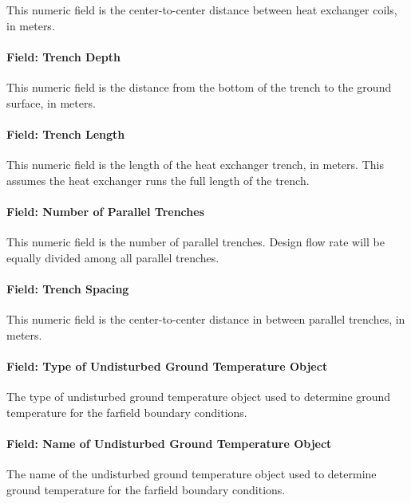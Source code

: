This numeric field is the center-to-center distance between heat exchanger coils, in meters.

\paragraph{Field: Trench Depth}\label{field-trench-depth}

This numeric field is the distance from the bottom of the trench to the ground surface, in meters.

\paragraph{Field: Trench Length}\label{field-trench-length}

This numeric field is the length of the heat exchanger trench, in meters. This assumes the heat exchanger runs the full length of the trench.

\paragraph{Field: Number of Parallel Trenches}\label{field-number-of-parallel-trenches}

This numeric field is the number of parallel trenches. Design flow rate will be equally divided among all parallel trenches.

\paragraph{Field: Trench Spacing}\label{field-trench-spacing}

This numeric field is the center-to-center distance in between parallel trenches, in meters.

\paragraph{Field: Type of Undisturbed Ground Temperature Object}

The type of undisturbed ground temperature object used to determine ground temperature for the farfield boundary conditions.

\paragraph{Field: Name of Undisturbed Ground Temperature Object}

The name of the undisturbed ground temperature object used to determine ground temperature for the farfield boundary conditions.

